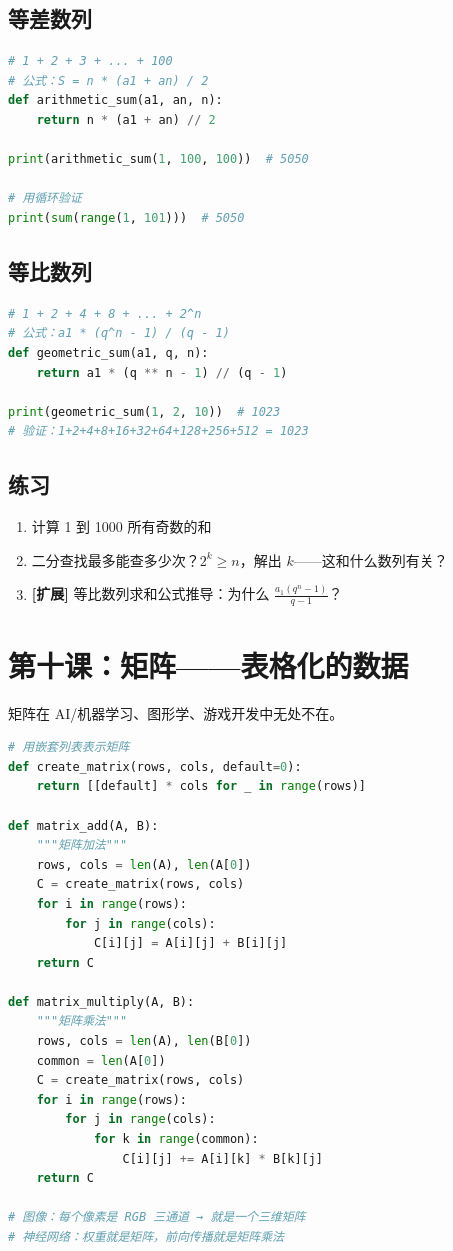 \documentclass[a4paper,12pt]{ctexart}
\begin{document}
\subsection*{等差数列}

\begin{lstlisting}[language=Python]
# 1 + 2 + 3 + ... + 100
# 公式：S = n * (a1 + an) / 2
def arithmetic_sum(a1, an, n):
    return n * (a1 + an) // 2

print(arithmetic_sum(1, 100, 100))  # 5050

# 用循环验证
print(sum(range(1, 101)))  # 5050
\end{lstlisting}

\subsection*{等比数列}

\begin{lstlisting}[language=Python]
# 1 + 2 + 4 + 8 + ... + 2^n
# 公式：a1 * (q^n - 1) / (q - 1)
def geometric_sum(a1, q, n):
    return a1 * (q ** n - 1) // (q - 1)

print(geometric_sum(1, 2, 10))  # 1023
# 验证：1+2+4+8+16+32+64+128+256+512 = 1023
\end{lstlisting}

\subsection*{练习}

\begin{enumerate}
  \item 计算 1 到 1000 所有奇数的和
  \item 二分查找最多能查多少次？$2^k \ge n$，解出 $k$——这和什么数列有关？
  \item \textbf{[扩展]} 等比数列求和公式推导：为什么 $\frac{a_1(q^n-1)}{q-1}$？
\end{enumerate}

\section*{第十课：矩阵——表格化的数据}

矩阵在 AI/机器学习、图形学、游戏开发中无处不在。

\begin{lstlisting}[language=Python]
# 用嵌套列表表示矩阵
def create_matrix(rows, cols, default=0):
    return [[default] * cols for _ in range(rows)]

def matrix_add(A, B):
    """矩阵加法"""
    rows, cols = len(A), len(A[0])
    C = create_matrix(rows, cols)
    for i in range(rows):
        for j in range(cols):
            C[i][j] = A[i][j] + B[i][j]
    return C

def matrix_multiply(A, B):
    """矩阵乘法"""
    rows, cols = len(A), len(B[0])
    common = len(A[0])
    C = create_matrix(rows, cols)
    for i in range(rows):
        for j in range(cols):
            for k in range(common):
                C[i][j] += A[i][k] * B[k][j]
    return C

# 图像：每个像素是 RGB 三通道 → 就是一个三维矩阵
# 神经网络：权重就是矩阵，前向传播就是矩阵乘法
\end{lstlisting}
\end{document}
